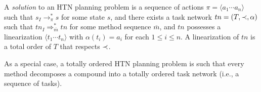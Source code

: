 
A \emph{solution} to an HTN planning problem is a sequence of actions $\pi = \langle a_{1} \cdots a_{n} \rangle$ such that $s_{I} \to^{\ast}_{\pi} s$ for some state $s$, and there exists a task network $tn = (T, \mathord{\prec}{}, \alpha)$ such that $tn_{I} \Rightarrow^{\ast}_{\overline{m}} tn$ for some method sequence $\overline{m}$, and $tn$ possesses a linearization $\langle t_{1} \cdots t_{n} \rangle$ with $\alpha(t_{i}) = a_{i}$ for each $1 \leq i \leq n$. A linearization of $tn$ is a total order of $T$ that respects $\mathord{\prec}{}$.

As a special case, a totally ordered HTN planning problem is such that every method decomposes a compound into a totally ordered task network (i.e., a sequence of tasks).
